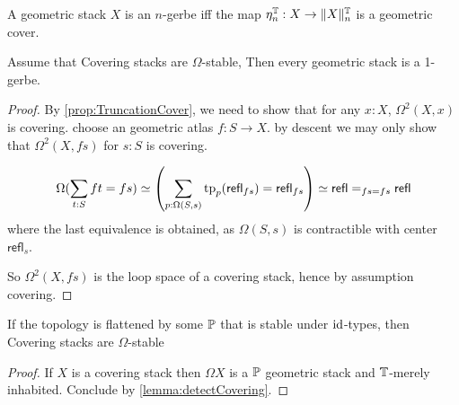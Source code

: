 \documentclass{article}
\newcommand{\refl}{\mathsf{refl}}
\begin{document}
\begin{definition}
	A geometric stack $X$ is an $n$-gerbe iff the map $\eta_n^{\mathbb{T}} : X \to \|X\|_n^{\mathbb{T}}$ is a geometric cover.
\end{definition}
\begin{theorem}
	Assume that Covering stacks are $\Omega$-stable, %
	Then every geometric stack is a 1-gerbe. %
\end{theorem}
\begin{proof}
	By \ref{prop:TruncationCover}, we need to show that for any $x : X$, $\Omega^2(X,x)$ is covering.
	choose an geometric atlas $f : S \to X$. by descent we may only show that $\Omega^2(X , fs)$ for $s : S$ is covering.
 	
 	\[
 	\Omega(\sum_{t : S} ft = fs) \simeq \left (\sum_{p : \Omega(S,s)} \tp_p (\refl_{f s}) = \refl_{f s} \right) \simeq \refl =_{f s = f s} \refl
 	\]
 	where the last equivalence is obtained, as $\Omega(S,s)$ is contractible with center $\refl_s$.
 	
 	So $\Omega^2(X,fs)$ is the loop space of a covering stack, hence by assumption covering.
\end{proof}
\begin{lemma}
	If the topology is flattened by some $\mathbb{P}$ that is stable under $\operatorname{id}$-types, then Covering stacks are $\Omega$-stable
\end{lemma}
\begin{proof}
	If $X$ is a covering stack then $\Omega X$ is a $\mathbb{P}$ geometric stack and $\mathbb{T}$-merely inhabited. Conclude by  \ref{lemma:detectCovering}.
\end{proof}
\end{document}
